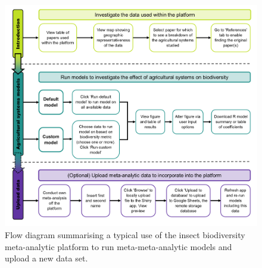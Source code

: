 \documentclass[11pt]{article}
\begin{document}
		\begin{figure}[H] 
			\centering 
			\includegraphics[scale=0.5]{figure_1_app_usage_flow_diagram.png} 
			\caption{Flow diagram summarising a typical use of the insect biodiversity meta-analytic platform to run meta-meta-analytic models and upload a new data set.}  
		\end{figure}
		
\end{document}
